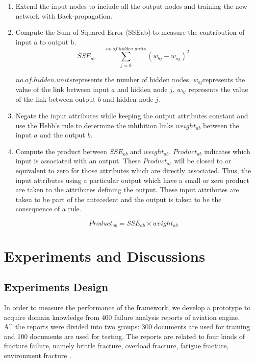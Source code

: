 \documentclass{elsarticle}
\begin{document}
\begin{enumerate}
\item Extend the input nodes to include all the output nodes and
  training the new network with Back-propagation.
\item Compute the Sum of Squared Error (SSEab) to measure the contribution of input a to output b.
\[SSE_{ab} = \sum_{j=0}^{no.of.hidden.units}{(w_{bj}-w_{aj})}^2\]

$no.of.hidden.units$represents the number of hidden nodes,
$w_{aj}$represents the value of the link between input $a$ and hidden
node $j$, $w_{bj}$ represents the value of the link between output $b$
and hidden node $j$. 
\item  Negate the input attributes while keeping the output attributes
constant and use the Hebb’s rule to determine the inhibition links
$weight_{ab}$ between the input $a$ and the output $b$.
\item Compute the product between $SSE_{ab}$ and
$weight_{ab}$. $Product_{ab}$ indicates which input is associated with
an output. These $Product_{ab}$ will be closed to or equivalent to
zero for those attributes which are directly associated. Thus, the
input attributes using a particular output which have a small or zero
product are taken to the attributes defining the output. These input
attributes are taken to be part of the antecedent and the output is
taken to be the consequence of a rule. 

\[Product_{ab} = SSE_{ab}\times weight_{ab}\]

\end{enumerate}

\section{Experiments and Discussions }
\label{sec:exper-disc-}

\subsection{Experiments Design
}
\label{sec:experiments-design-}

In order to measure the performance of the framework, we develop a
prototype  to acquire domain
knowledge from 400 failure analysis reports of aviation engine. All
the reports were divided into two groups: 300 documents are used for
training and 100 documents are used for testing. The reports are
related to four kinds of fracture failure, namely brittle fracture,
overload fracture, fatigue fracture, environment fracture
\cite{medema}.
\end{document}
